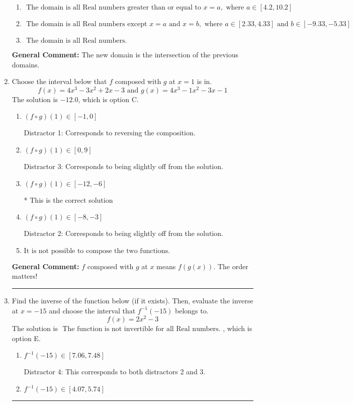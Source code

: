\documentclass{extbook}[14pt]
\newcommand{\litem}[1]{\item #1

\rule{\textwidth}{0.4pt}}
\begin{document}
\begin{enumerate}
{\begin{enumerate}[label=\Alph*.]
\item \( \text{ The domain is all Real numbers greater than or equal to } x = a, \text{ where } a \in [4.2, 10.2] \)


\item \( \text{ The domain is all Real numbers except } x = a \text{ and } x = b, \text{ where } a \in [2.33, 4.33] \text{ and } b \in [-9.33, -5.33] \)


\item \( \text{ The domain is all Real numbers. } \)


\end{enumerate}

\textbf{General Comment:} The new domain is the intersection of the previous domains.
}
\litem{
Choose the interval below that $f$ composed with $g$ at $x=1$ is in.
\[ f(x) = 4x^{3} -3 x^{2} +2 x -3 \text{ and } g(x) = 4x^{3} -1 x^{2} -3 x -1 \]The solution is \( -12.0 \), which is option C.\begin{enumerate}[label=\Alph*.]
\item \( (f \circ g)(1) \in [-1, 0] \)

 Distractor 1: Corresponds to reversing the composition.
\item \( (f \circ g)(1) \in [0, 9] \)

 Distractor 3: Corresponds to being slightly off from the solution.
\item \( (f \circ g)(1) \in [-12, -6] \)

* This is the correct solution
\item \( (f \circ g)(1) \in [-8, -3] \)

 Distractor 2: Corresponds to being slightly off from the solution.
\item \( \text{It is not possible to compose the two functions.} \)


\end{enumerate}

\textbf{General Comment:} $f$ composed with $g$ at $x$ means $f(g(x))$. The order matters!
}
\litem{
Find the inverse of the function below (if it exists). Then, evaluate the inverse at $x = -15$ and choose the interval that $f^{-1}(-15)$ belongs to.
\[ f(x) = 2 x^2 - 3 \]The solution is \( \text{ The function is not invertible for all Real numbers. } \), which is option E.\begin{enumerate}[label=\Alph*.]
\item \( f^{-1}(-15) \in [7.06, 7.48] \)

 Distractor 4: This corresponds to both distractors 2 and 3.
\item \( f^{-1}(-15) \in [4.07, 5.74] \)


\end{enumerate}}
\end{enumerate}
\end{document}
